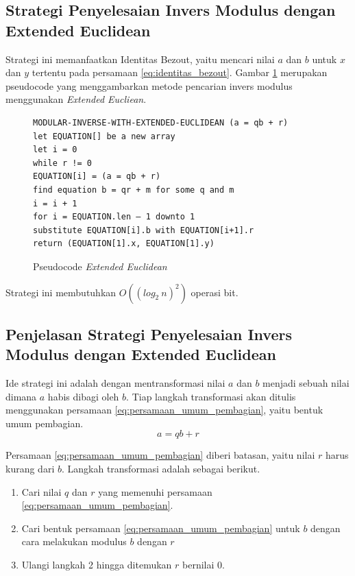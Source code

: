 \subsection {Strategi Penyelesaian Invers Modulus dengan Extended Euclidean}

Strategi ini memanfaatkan Identitas Bezout, yaitu mencari nilai $ a $ dan $ b $ untuk $ x $ dan $ y $ tertentu pada persamaan \eqref{eq:identitas_bezout}. Gambar \ref{psdo:extended_euclidean} merupakan pseudocode yang menggambarkan metode pencarian invers modulus menggunakan \textit{Extended Eucliean}.

\begin{figure}[h!]
\begin{lstlisting}[firstnumber=0]
MODULAR-INVERSE-WITH-EXTENDED-EUCLIDEAN (a = qb + r)
let EQUATION[] be a new array
let i = 0
while r != 0
EQUATION[i] = (a = qb + r)
find equation b = qr + m for some q and m
i = i + 1
for i = EQUATION.len – 1 downto 1
substitute EQUATION[i].b with EQUATION[i+1].r
return (EQUATION[1].x, EQUATION[1].y)
\end{lstlisting}
\caption{Pseudocode \textit{Extended Euclidean}}
\label{psdo:extended_euclidean}
\end{figure}

Strategi ini membutuhkan $ O((log_2\ n)^2) $ operasi bit. \cite{hac_math}

\subsection{Penjelasan Strategi Penyelesaian Invers Modulus dengan Extended Euclidean}

Ide strategi ini adalah dengan mentransformasi nilai $ a $ dan $ b $ menjadi sebuah nilai dimana $ a $ habis dibagi oleh $ b $. Tiap langkah transformasi akan ditulis menggunakan persamaan \eqref{eq:persamaan_umum_pembagian}, yaitu bentuk umum pembagian.
\begin{equation*}
a=qb+r
\end{equation*}

Persamaan \eqref{eq:persamaan_umum_pembagian} diberi batasan, yaitu nilai $ r $ harus kurang dari $ b $. Langkah transformasi adalah sebagai berikut.
\begin{enumerate}
\item Cari nilai $ q $ dan $ r $ yang memenuhi persamaan \eqref{eq:persamaan_umum_pembagian}.
\item Cari bentuk persamaan \eqref{eq:persamaan_umum_pembagian} untuk $ b $ dengan cara melakukan modulus $ b $ dengan $ r $
\item Ulangi langkah 2 hingga ditemukan $ r $ bernilai 0.
\end{enumerate}

